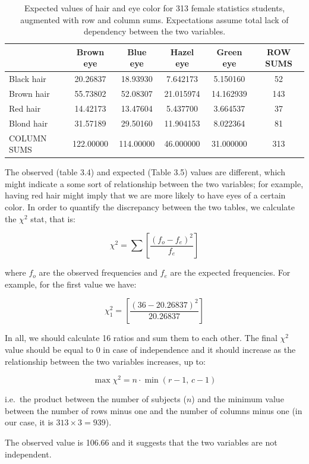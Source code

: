 \documentclass[a4paper,12pt,oneside]{book}
\begin{document}
\begin{table}

\caption{\label{tab:unnamed-chunk-8}Expected values of hair and eye color for 313 female statistics students, augmented with row and column sums. Expectations assume total lack of dependency between the two variables.}
\centering
\begin{tabular}[t]{lccccc}
\toprule
  & Brown eye & Blue eye & Hazel eye & Green eye & ROW SUMS\\
\midrule
Black hair & 20.26837 & 18.93930 & 7.642173 & 5.150160 & 52\\
Brown hair & 55.73802 & 52.08307 & 21.015974 & 14.162939 & 143\\
Red hair & 14.42173 & 13.47604 & 5.437700 & 3.664537 & 37\\
Blond hair & 31.57189 & 29.50160 & 11.904153 & 8.022364 & 81\\
COLUMN SUMS & 122.00000 & 114.00000 & 46.000000 & 31.000000 & 313\\
\bottomrule
\end{tabular}
\end{table}

The observed (table 3.4) and expected (Table 3.5) values are different, which might indicate a some sort of relationship between the two variables; for example, having red hair might imply that we are more likely to have eyes of a certain color. In order to quantify the discrepancy between the two tables, we calculate the \(\chi^2\) stat, that is:

\[\chi ^2  = \sum \left[ \frac{\left( {f_o  - f_e } \right)^2 }{f_e } \right]\]

where \(f_o\) are the observed frequencies and \(f_e\) are the expected frequencies. For example, for the first value we have:

\[\chi^2_1  = \left[ \frac{\left( {36  - 20.26837 } \right)^2 }{20.26837 } \right]\]

In all, we should calculate 16 ratios and sum them to each other. The final \(\chi^2\) value should be equal to 0 in case of independence and it should increase as the relationship between the two variables increases, up to:

\[\max \chi ^2  = n \cdot \min (r - 1,\,c - 1)\]

i.e.~the product between the number of subjects (\(n\)) and the minimum value between the number of rows minus one and the number of columns minus one (in our case, it is \(313 \times 3 = 939\)).

The observed value is 106.66 and it suggests that the two variables are not independent.
\end{document}
